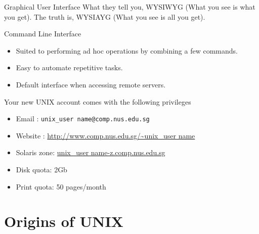 


\begin{frame}
\begin{block}{Graphical User Interface}
What they tell you, WYSIWYG (What you see is what you get). \pause
The truth is, WYSIAYG (What you see is all you get).
\end{block}

\pause

\begin{block}{Command Line Interface}
\begin{itemize}
\item Suited to performing ad hoc operations by combining a few commands.  
\item Easy to automate repetitive tasks.
\item Default interface when accessing remote servers.  
\end{itemize}
\end{block}
\end{frame}



\begin{frame}
Your new UNIX account comes with the following privileges
\begin{itemize}
\item Email : \texttt{unix\_user name@comp.nus.edu.sg}
\item Website : \url{http://www.comp.nus.edu.sg/~unix_user name}
\item Solaris zone: \url{unix_user name-z.comp.nus.edu.sg}
\item Disk quota: 2Gb
\item Print quota: 50 pages/month
\end{itemize}
\end{frame}

\section{Origins of UNIX}

